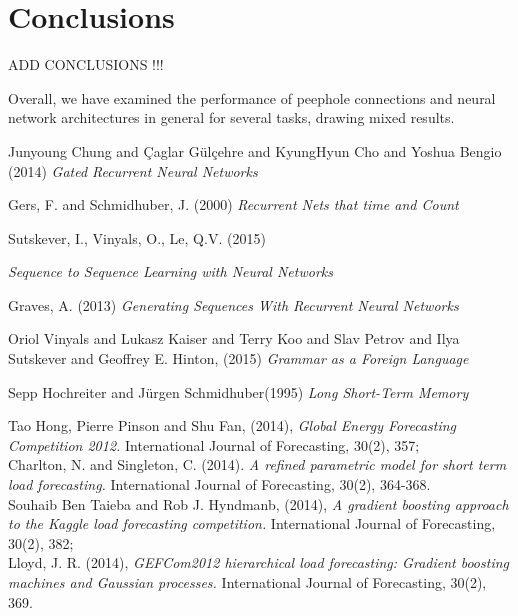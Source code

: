 \documentclass{article} %
\begin{document}
\section{Conclusions}
\label{sec:conclusions}

{\LARGE \color{red} ADD CONCLUSIONS !!!}

Overall, we have examined the performance of peephole connections and neural network architectures in general for several tasks, drawing mixed results. 




\begin{thebibliography}{9}


\small{




Junyoung Chung and
               {\c{C}}aglar G{\"{u}}l{\c{c}}ehre and
               KyungHyun Cho and
               Yoshua Bengio (2014)
{\it Gated Recurrent Neural Networks}


Gers, F. and Schmidhuber, J. (2000)
{\it  Recurrent Nets that time and Count} 


Sutskever, I., Vinyals, O., Le, Q.V. (2015)

{\it Sequence to Sequence Learning with Neural Networks}


Graves, A. (2013)
{\it Generating Sequences With Recurrent Neural Networks}

Oriol Vinyals and
               Lukasz Kaiser and
               Terry Koo and
               Slav Petrov and
               Ilya Sutskever and
               Geoffrey E. Hinton, (2015)
{\it Grammar as a Foreign Language}


Sepp Hochreiter and Jürgen Schmidhuber(1995)
{\it Long Short-Term Memory}

Tao Hong, Pierre Pinson and Shu Fan, 
(2014), {\it Global Energy Forecasting Competition 2012.}
International Journal of Forecasting, 30(2), 357;
\\

Charlton, N. and Singleton, C. 
(2014). 
{\it A refined parametric model for short term load forecasting.}
International Journal of Forecasting,
30(2), 364-368.
\\
Souhaib Ben Taieba and Rob J. Hyndmanb,
(2014), 
{\it A gradient boosting approach to the Kaggle load forecasting 
competition.}
International Journal of Forecasting, 30(2), 382;
\\
Lloyd, J. R. (2014), 
{\it GEFCom2012 hierarchical load forecasting: Gradient boosting machines and Gaussian processes. }
International Journal of Forecasting, 30(2), 369.


}

\end{thebibliography}
\end{document}
